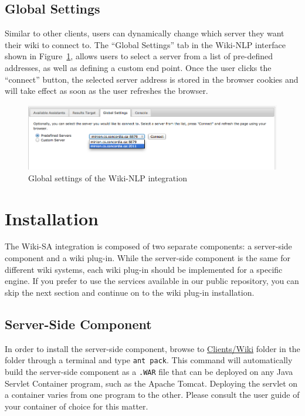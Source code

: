 \subsection{Global Settings}
Similar to other \sa clients, users can dynamically change which \sa server they want their wiki to connect to. The ``Global Settings'' tab in the Wiki-NLP interface shown in Figure~\ref{fig:semassist_settings}, allows users to select a \sa server from a list of pre-defined addresses, as well as defining a custom end point. Once the user clicks the ``connect'' button, the selected server address is stored in the browser cookies and will take effect as soon as the user refreshes the browser.

\begin{figure}[h!]
\centering
\includegraphics[width=\textwidth]{pictures/semassist_settings.png}
\caption{Global settings of the Wiki-NLP integration}
\label{fig:semassist_settings}
\end{figure}

\section{Installation}
The Wiki-SA integration is composed of two separate components: a server-side component and a wiki plug-in. While the server-side component is the same for different wiki systems, each wiki plug-in should be implemented for a specific engine. If you prefer to use the services available in our public repository, you can skip the next section and continue on to the wiki plug-in installation.

\subsection{Server-Side Component}
\label{sec:wiki_component}
In order to install the server-side component, browse to \url{Clients/Wiki} folder in the \sa folder through a terminal and type \texttt{ant pack}. This command will automatically build the server-side component as a \texttt{.WAR} file that can be deployed on any Java Servlet Container program, such as the Apache Tomcat. Deploying the servlet on a container varies from one program to the other. Please consult the user guide of your container of choice for this matter.

